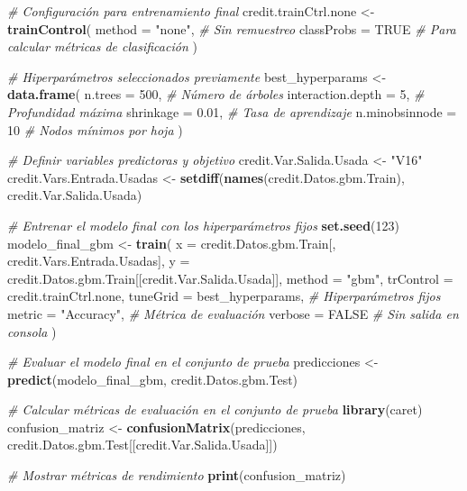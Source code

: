 \documentclass[
]{article}
\newenvironment{Shaded}{\begin{snugshade}}{\end{snugshade}}
\newcommand{\AttributeTok}[1]{\textcolor[rgb]{0.13,0.29,0.53}{#1}}
\newcommand{\CommentTok}[1]{\textcolor[rgb]{0.56,0.35,0.01}{\textit{#1}}}
\newcommand{\ConstantTok}[1]{\textcolor[rgb]{0.56,0.35,0.01}{#1}}
\newcommand{\DecValTok}[1]{\textcolor[rgb]{0.00,0.00,0.81}{#1}}
\newcommand{\FloatTok}[1]{\textcolor[rgb]{0.00,0.00,0.81}{#1}}
\newcommand{\FunctionTok}[1]{\textcolor[rgb]{0.13,0.29,0.53}{\textbf{#1}}}
\newcommand{\NormalTok}[1]{#1}
\newcommand{\OtherTok}[1]{\textcolor[rgb]{0.56,0.35,0.01}{#1}}
\newcommand{\StringTok}[1]{\textcolor[rgb]{0.31,0.60,0.02}{#1}}
\begin{document}
\begin{Shaded}
\begin{Highlighting}[]
\CommentTok{\# Configuración para entrenamiento final}
\NormalTok{credit.trainCtrl.none }\OtherTok{\textless{}{-}} \FunctionTok{trainControl}\NormalTok{(}
  \AttributeTok{method =} \StringTok{"none"}\NormalTok{,  }\CommentTok{\# Sin remuestreo}
  \AttributeTok{classProbs =} \ConstantTok{TRUE} \CommentTok{\# Para calcular métricas de clasificación}
\NormalTok{)}

\CommentTok{\# Hiperparámetros seleccionados previamente}
\NormalTok{best\_hyperparams }\OtherTok{\textless{}{-}} \FunctionTok{data.frame}\NormalTok{(}
  \AttributeTok{n.trees =} \DecValTok{500}\NormalTok{,              }\CommentTok{\# Número de árboles}
  \AttributeTok{interaction.depth =} \DecValTok{5}\NormalTok{,      }\CommentTok{\# Profundidad máxima}
  \AttributeTok{shrinkage =} \FloatTok{0.01}\NormalTok{,           }\CommentTok{\# Tasa de aprendizaje}
  \AttributeTok{n.minobsinnode =} \DecValTok{10}         \CommentTok{\# Nodos mínimos por hoja}
\NormalTok{)}

\CommentTok{\# Definir variables predictoras y objetivo}
\NormalTok{credit.Var.Salida.Usada }\OtherTok{\textless{}{-}} \StringTok{"V16"}
\NormalTok{credit.Vars.Entrada.Usadas }\OtherTok{\textless{}{-}} \FunctionTok{setdiff}\NormalTok{(}\FunctionTok{names}\NormalTok{(credit.Datos.gbm.Train), credit.Var.Salida.Usada)}

\CommentTok{\# Entrenar el modelo final con los hiperparámetros fijos}
\FunctionTok{set.seed}\NormalTok{(}\DecValTok{123}\NormalTok{)}
\NormalTok{modelo\_final\_gbm }\OtherTok{\textless{}{-}} \FunctionTok{train}\NormalTok{(}
  \AttributeTok{x =}\NormalTok{ credit.Datos.gbm.Train[, credit.Vars.Entrada.Usadas],}
  \AttributeTok{y =}\NormalTok{ credit.Datos.gbm.Train[[credit.Var.Salida.Usada]],}
  \AttributeTok{method =} \StringTok{"gbm"}\NormalTok{,}
  \AttributeTok{trControl =}\NormalTok{ credit.trainCtrl.none,}
  \AttributeTok{tuneGrid =}\NormalTok{ best\_hyperparams,  }\CommentTok{\# Hiperparámetros fijos}
  \AttributeTok{metric =} \StringTok{"Accuracy"}\NormalTok{,          }\CommentTok{\# Métrica de evaluación}
  \AttributeTok{verbose =} \ConstantTok{FALSE}               \CommentTok{\# Sin salida en consola}
\NormalTok{)}

\CommentTok{\# Evaluar el modelo final en el conjunto de prueba}
\NormalTok{predicciones }\OtherTok{\textless{}{-}} \FunctionTok{predict}\NormalTok{(modelo\_final\_gbm, credit.Datos.gbm.Test)}

\CommentTok{\# Calcular métricas de evaluación en el conjunto de prueba}
\FunctionTok{library}\NormalTok{(caret)}
\NormalTok{confusion\_matriz }\OtherTok{\textless{}{-}} \FunctionTok{confusionMatrix}\NormalTok{(predicciones, credit.Datos.gbm.Test[[credit.Var.Salida.Usada]])}

\CommentTok{\# Mostrar métricas de rendimiento}
\FunctionTok{print}\NormalTok{(confusion\_matriz)}
\end{Highlighting}
\end{Shaded}
\end{document}
